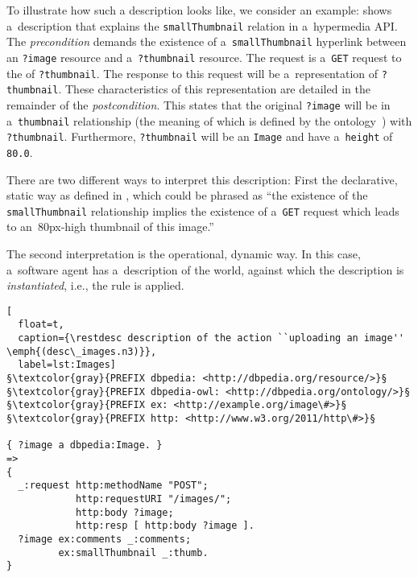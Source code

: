 To illustrate how such a \restdesc description looks like, we consider an example:  shows a~description
that explains the \verb!smallThumbnail! relation in a~hypermedia API.
The \emph{precondition} demands the existence of
a~\verb!smallThumbnail! hyperlink
between an \verb!?image! resource
and a~\verb!?thumbnail! resource.
The \http request
is a~\verb!GET! request to the \URL of \verb!?thumbnail!.
The response to this request will be a~representation of \verb!?thumbnail!.
These characteristics of this representation are detailed in the remainder of the \emph{postcondition}.
This states that the original \verb!?image!
will be in a~\verb!thumbnail! relationship
(the meaning of which is defined by the \dbpedia ontology~\cite{DBpedia})
with \verb!?thumbnail!.
Furthermore, \verb!?thumbnail! will be an \verb!Image!
and have a~\verb!height! of \verb!80.0!.

There are two different ways to interpret this description:
First the declarative, static way as defined in ,
which could be phrased as
\enquote{the existence of the \texttt{smallThumbnail} relationship
implies the existence of a~\texttt{GET} request
which leads to an~80px-high thumbnail of this image.}

The second interpretation is the operational, dynamic way.
In this case, a~software agent has a~description of the world,
against which the description is \emph{instantiated},
i.e., the rule is applied.

\begin{lstlisting}[
  float=t,
  caption={\restdesc description of the action ``uploading an image'' \emph{(desc\_images.n3)}},
  label=lst:Images]
§\textcolor{gray}{PREFIX dbpedia: <http://dbpedia.org/resource/>}§
§\textcolor{gray}{PREFIX dbpedia-owl: <http://dbpedia.org/ontology/>}§
§\textcolor{gray}{PREFIX ex: <http://example.org/image\#>}§
§\textcolor{gray}{PREFIX http: <http://www.w3.org/2011/http\#>}§

{ ?image a dbpedia:Image. }
=>
{
  _:request http:methodName "POST";
            http:requestURI "/images/";
            http:body ?image;
            http:resp [ http:body ?image ].
  ?image ex:comments _:comments;
         ex:smallThumbnail _:thumb.
}
\end{lstlisting}


